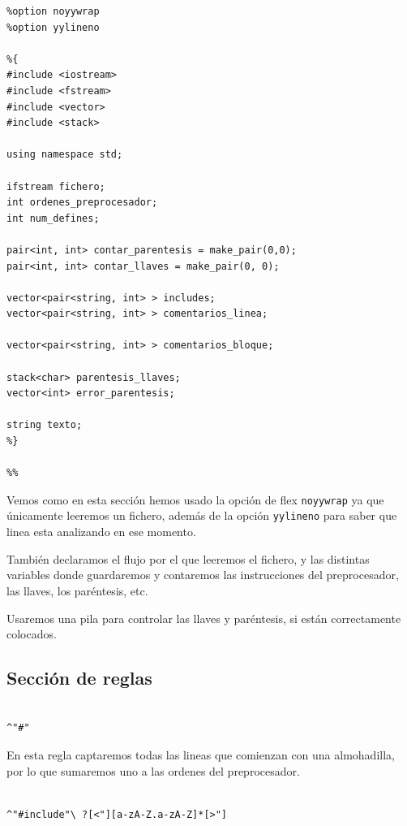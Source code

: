 \documentclass[12pt, spanish]{article}
\begin{document}
\begin{verbatim}
%option noyywrap
%option yylineno

%{
#include <iostream>
#include <fstream>
#include <vector>
#include <stack>

using namespace std;

ifstream fichero;
int ordenes_preprocesador;
int num_defines;

pair<int, int> contar_parentesis = make_pair(0,0);
pair<int, int> contar_llaves = make_pair(0, 0);

vector<pair<string, int> > includes;
vector<pair<string, int> > comentarios_linea;

vector<pair<string, int> > comentarios_bloque;

stack<char> parentesis_llaves;
vector<int> error_parentesis;

string texto;
%}

%%

\end{verbatim}


Vemos como en esta sección hemos usado la opción de flex \texttt{noyywrap} ya que únicamente leeremos un fichero, además de la opción \texttt{yylineno} para saber que linea esta analizando en ese momento.

También declaramos el flujo por el que leeremos el fichero, y las distintas variables donde guardaremos y contaremos las instrucciones del preprocesador, las llaves, los paréntesis, etc.

Usaremos una pila para controlar las llaves y paréntesis, si están correctamente colocados.


\subsection{Sección de reglas}

\begin{verbatim}

^"#"

\end{verbatim}

En esta regla captaremos todas las lineas que comienzan con una almohadilla, por lo que sumaremos uno a las ordenes del preprocesador.



\begin{verbatim}

^"#include"\ ?[<"][a-zA-Z.a-zA-Z]*[>"]

\end{verbatim}
\end{document}
